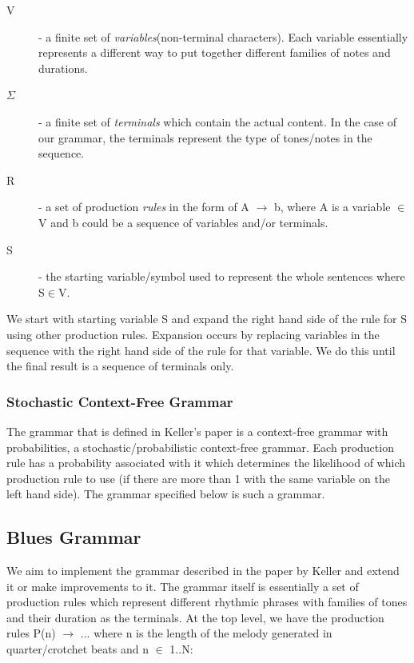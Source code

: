 \documentclass[pdftex,12pt,a4paper]{report}
\begin{document}
\begin{description}
  \item[V] - a finite set of \emph{variables}(non-terminal characters). Each variable essentially represents a different way to put together different families of notes and durations.
  \item[$\Sigma$]  - a finite set of \emph{terminals} which contain the actual content. In the case of our grammar, the terminals represent the type of tones/notes in the sequence.
  \item[R] - a set of production \emph{rules} in the form of A $\rightarrow$ b, where A is a variable $\in$V and b could be a sequence of variables and/or terminals.
  \item[S] - the starting variable/symbol used to represent the whole sentences where S$\in$V.
\end{description}


We start with starting variable S and expand the right hand side of the rule for S using other production rules. Expansion occurs by replacing variables in the sequence with the right hand side of the rule for that variable. We do this until the final result is a sequence of terminals only.

\subsubsection{Stochastic Context-Free Grammar}
The grammar that is defined in Keller's paper \cite{keller07} is a context-free grammar with probabilities, a stochastic/probabilistic context-free grammar. Each production rule has a probability associated with it which determines the likelihood of which production rule to use (if there are more than 1 with the same variable on the left hand side). The grammar specified below is such a grammar.

\subsection{Blues Grammar}
We aim to implement the grammar described in the paper by Keller \cite{keller07} and extend it or make improvements to it. The grammar itself is essentially a set of production rules which represent different rhythmic phrases with families of tones and their duration as the terminals. At the top level, we have the production rules P(n) $\rightarrow$ ... where n is the length of the melody generated in quarter/crotchet beats and n $\in$ 1..N:
\end{document}
